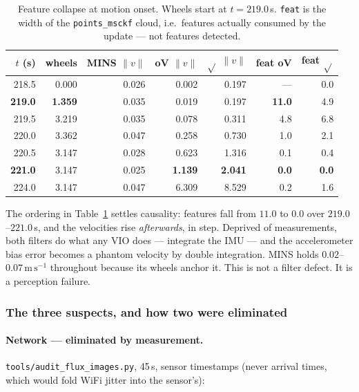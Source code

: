 \begin{table}[htbp]
\centering
\caption{Feature collapse at motion onset. Wheels start at $t=219.0$\,s.
\texttt{feat} is the width of the \texttt{points\_msckf} cloud, i.e.\ features
actually consumed by the update --- not features detected.}
\label{tab:collapse}
\begin{tabular}{rrrrrrr}
\hline
$t$ (s) & wheels & MINS $\lVert v\rVert$ & oV $\lVert v\rVert$ & $\sqrt{}$ $\lVert v\rVert$ & feat oV & feat $\sqrt{}$ \\
\hline
218.5 & 0.000 & 0.026 & 0.002 & 0.197 & --- & 0.0 \\
\textbf{219.0} & \textbf{1.359} & 0.035 & 0.019 & 0.197 & \textbf{11.0} & 4.9 \\
219.5 & 3.219 & 0.035 & 0.078 & 0.311 & 4.8 & 6.8 \\
220.0 & 3.362 & 0.047 & 0.258 & 0.730 & 1.0 & 2.1 \\
220.5 & 3.147 & 0.028 & 0.623 & 1.316 & 0.1 & 0.4 \\
\textbf{221.0} & 3.147 & 0.025 & \textbf{1.139} & \textbf{2.041} & \textbf{0.0} & \textbf{0.0} \\
224.0 & 3.147 & 0.047 & 6.309 & 8.529 & 0.2 & 1.6 \\
\hline
\end{tabular}
\end{table}

The ordering in Table~\ref{tab:collapse} settles causality: features fall from
$11.0$ to $0.0$ over $219.0$--$221.0$\,s, and the velocities rise
\emph{afterwards}, in step. Deprived of measurements, both filters do what any
VIO does --- integrate the IMU --- and the accelerometer bias error becomes a
phantom velocity by double integration. MINS holds
$0.02$--$0.07\,\mathrm{m\,s^{-1}}$ throughout because its wheels anchor it.
This is not a filter defect. It is a perception failure.

\subsubsection{The three suspects, and how two were eliminated}

\paragraph{Network --- eliminated by measurement.} \texttt{tools/audit\_flux\_images.py},
45\,s, sensor timestamps (never arrival times, which would fold WiFi jitter
into the sensor's):

